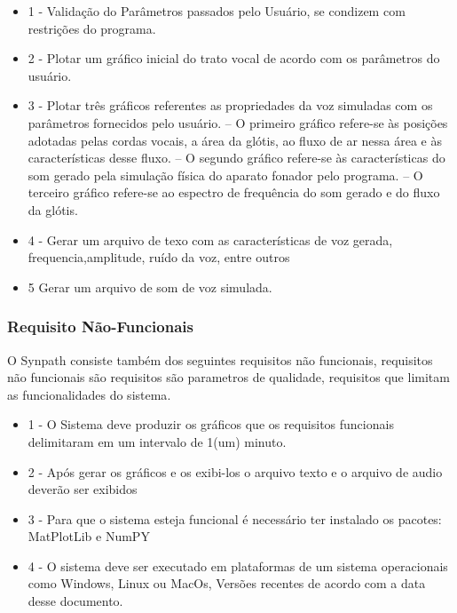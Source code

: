 		\begin{itemize}
			\item 1 - Validação do Parâmetros passados pelo Usuário, se condizem com restrições do programa.
			\item 2 - Plotar um gráﬁco inicial do trato vocal de acordo com os parâmetros do usuário.
			\item 3 - Plotar três gráﬁcos referentes as propriedades da voz simuladas com os parâmetros fornecidos pelo usuário. – O primeiro gráﬁco refere-se às posições adotadas pelas cordas vocais, a área da glótis, ao ﬂuxo de ar nessa área e às características desse ﬂuxo. – O segundo gráﬁco refere-se às características do som gerado pela simulação física do aparato fonador pelo programa. – O terceiro gráﬁco refere-se ao espectro de frequência do som gerado e do ﬂuxo da glótis.
			\item 4 - Gerar um arquivo de texo com as características de voz gerada, frequencia,amplitude, ruído da voz, entre outros
			\item 5 Gerar um arquivo de som de voz simulada.
		\end{itemize}
		
		\subsubsection{Requisito Não-Funcionais}
		
		O Synpath consiste também dos seguintes requisitos não funcionais, requisitos não funcionais são requisitos são parametros de qualidade, requisitos que limitam as funcionalidades do sistema\cite{SWEBOK}.
		
		\begin{itemize}
			\item 1 - O Sistema deve produzir os gráficos que os requisitos funcionais delimitaram em um intervalo de 1(um) minuto. 
			\item 2  - Após gerar os gráficos e os exibi-los o arquivo texto e o arquivo de audio deverão ser exibidos
			\item 3 - Para que o sistema esteja funcional é necessário ter instalado os pacotes: MatPlotLib e NumPY
			\item 4 - O sistema deve ser executado em plataformas de um sistema operacionais como Windows, Linux ou MacOs, Versões recentes de acordo com a data desse documento. 
			
		\end{itemize}
		
	
	
